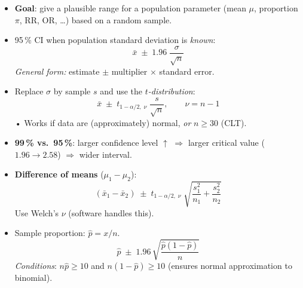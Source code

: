 \documentclass[12pt]{book}
\begin{document}
\begin{itemize}

\item \textbf{Goal}: give a plausible range for a population parameter  
      (mean $\mu$, proportion $\pi$, RR, OR, …) based on a random sample.

\item 95\,\% CI when population standard deviation is \emph{known}:
      \[
        \bar{x}\;\pm\;1.96\;
        \frac{\sigma}{\sqrt{n}}
      \]
      \emph{General form:} estimate $\pm$ multiplier $\times$ standard error.

\item Replace $\sigma$ by sample $s$ and use the \emph{$t$-distribution}:
      \[
        \bar{x}\;\pm\;t_{1-\alpha/2,\;\nu}\;
        \frac{s}{\sqrt{n}},\qquad
        \nu=n-1
      \]
      • Works if data are (approximately) normal, \textit{or} $n\ge 30$ (CLT).

\item \textbf{99\,\% vs.\ 95\,\%}: larger confidence level $\uparrow$  
      $\Rightarrow$ larger critical value ($1.96\to2.58$)  
      $\Rightarrow$ wider interval.

\item \textbf{Difference of means} ($\mu_1-\mu_2$):
      \[
        (\bar{x}_1-\bar{x}_2)\;\pm\;
        t_{1-\alpha/2,\;\nu}\;
        \sqrt{\frac{s_1^{2}}{n_1}+\frac{s_2^{2}}{n_2}}
      \]
      Use Welch’s $\nu$ (software handles this).

\item Sample proportion: $\hat{p}=x/n$.
      \[
        \hat{p}\;\pm\;1.96\,
        \sqrt{\frac{\hat{p}(1-\hat{p})}{n}}
      \]
      \textit{Conditions}: $n\hat{p}\ge 10$ and $n(1-\hat{p})\ge 10$  
      (ensures normal approximation to binomial).


\end{itemize}
\end{document}
